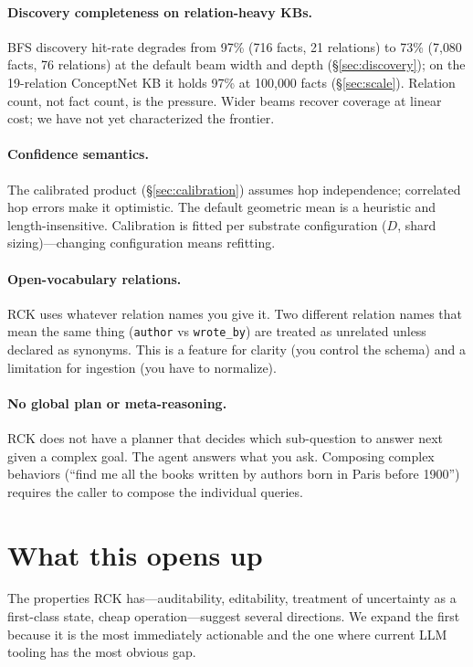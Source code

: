 \documentclass[11pt]{article}
\begin{document}
\paragraph{Discovery completeness on relation-heavy KBs.} BFS
discovery hit-rate degrades from 97\% (716 facts, 21 relations) to
73\% (7{,}080 facts, 76 relations) at the default beam width and
depth (\S\ref{sec:discovery}); on the 19-relation ConceptNet KB it
holds 97\% at 100{,}000 facts (\S\ref{sec:scale}). Relation count,
not fact count, is the pressure. Wider beams recover coverage at
linear cost; we have not yet characterized the frontier.

\paragraph{Confidence semantics.} The calibrated product
(\S\ref{sec:calibration}) assumes hop independence; correlated hop
errors make it optimistic. The default geometric mean is a heuristic
and length-insensitive. Calibration is fitted per substrate
configuration ($D$, shard sizing)---changing configuration means
refitting.

\paragraph{Open-vocabulary relations.} RCK uses whatever relation
names you give it. Two different relation names that mean the same
thing (\texttt{author} vs \texttt{wrote\_by}) are treated as
unrelated unless declared as synonyms. This is a feature for
clarity (you control the schema) and a limitation for ingestion (you
have to normalize).

\paragraph{No global plan or meta-reasoning.} RCK does not have a
planner that decides which sub-question to answer next given a
complex goal. The agent answers what you ask. Composing complex
behaviors (``find me all the books written by authors born in
Paris before 1900'') requires the caller to compose the individual
queries.

\section{What this opens up}

The properties RCK has---auditability, editability, treatment of
uncertainty as a first-class state, cheap operation---suggest
several directions. We expand the first because it is the most
immediately actionable and the one where current LLM tooling has
the most obvious gap.
\end{document}
